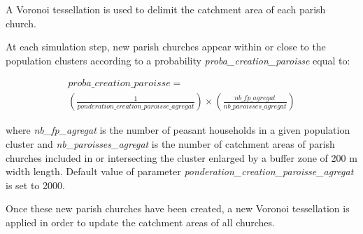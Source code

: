 \documentclass[a4paper,11pt]{article}
\begin{document}
{A Voronoi tessellation is used to delimit the catchment area of each parish church. 

At each simulation step, new parish churches appear within or close to the population clusters according to a probability \textit{proba\_creation\_paroisse} equal to:
\begin{small}
\begin{equation}
\begin{gathered}
proba\_creation\_paroisse =\\
\left( \frac{1}{ponderation\_creation\_paroisse\_agregat}\right) \times \left( \frac{nb\_fp\_agregat}{nb\_paroisses\_agregat} \right)
\end{gathered}
\end{equation}
\end{small}

\begin{sloppypar}
where \textit{nb\_fp\_agregat} is the number of peasant households in a given population cluster and \textit{nb\_paroisses\_agregat} is the number of catchment areas of parish churches included in or intersecting the cluster enlarged by a buffer zone of 200 m width length. Default value of parameter \textit{ponderation\_creation\_paroisse\_agregat} is set to 2000.

Once these new parish churches have been created, a new Voronoi tessellation is applied in order to update the catchment areas of all churches.


\end{sloppypar}}
\end{document}
